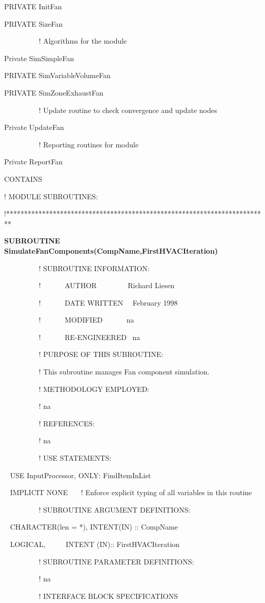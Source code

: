 PRIVATE InitFan

PRIVATE SizeFan

~~~~~~~~~ ! Algorithms for the module

Private SimSimpleFan

PRIVATE SimVariableVolumeFan

PRIVATE SimZoneExhaustFan

~~~~~~~~~ ! Update routine to check convergence and update nodes

Private UpdateFan

~~~~~~~~~ ! Reporting routines for module

Private ReportFan

CONTAINS

! MODULE SUBROUTINES:

!*************************************************************************

\textbf{SUBROUTINE SimulateFanComponents(CompName,FirstHVACIteration)}

~~~~~~~~~ ! SUBROUTINE INFORMATION:

~~~~~~~~~ !~~~~~~ AUTHOR~~~~~~~~ Richard Liesen

~~~~~~~~~ !~~~~~~ DATE WRITTEN~~ February 1998

~~~~~~~~~ !~~~~~~ MODIFIED~~~~~~ na

~~~~~~~~~ !~~~~~~ RE-ENGINEERED~ na

~~~~~~~~~ ! PURPOSE OF THIS SUBROUTINE:

~~~~~~~~~ ! This subroutine manages Fan component simulation.

~~~~~~~~~ ! METHODOLOGY EMPLOYED:

~~~~~~~~~ ! na

~~~~~~~~~ ! REFERENCES:

~~~~~~~~~ ! na

~~~~~~~~~ ! USE STATEMENTS:

~ USE InputProcessor, ONLY: FindItemInList

~ IMPLICIT NONE~~~ ! Enforce explicit typing of all variables in this routine

~~~~~~~~~ ! SUBROUTINE ARGUMENT DEFINITIONS:

~ CHARACTER(len = *), INTENT(IN) :: CompName

~ LOGICAL,~~~~~ INTENT (IN):: FirstHVACIteration

~~~~~~~~~ ! SUBROUTINE PARAMETER DEFINITIONS:

~~~~~~~~~ ! na

~~~~~~~~~ ! INTERFACE BLOCK SPECIFICATIONS

